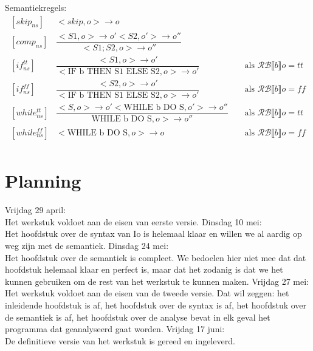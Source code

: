 \documentclass[12pt]{article}
\newcommand{\RB}{\mathcal{RB}}
\begin{document}
Semantiekregels:\\
\renewcommand*{\arraystretch}{2.5}
\[
\begin{matrix}
[skip_{ns}]  & <skip, o> \rightarrow o\\
[comp_{ns}]  & \dfrac{<S1, o> \rightarrow o' <S2, o'> \rightarrow o''}{<S1;S2, o> \rightarrow o''}\\
[if_{ns}^{tt}] & \dfrac{<S1, o> \rightarrow o'}{<\mbox{IF b THEN S1 ELSE S2}, o> \rightarrow o'} &&\mbox{ als }\RB \llbracket b \rrbracket o = tt\\
[if_{ns}^{ff}] & \dfrac{<S2, o> \rightarrow o'}{<\mbox{IF b THEN S1 ELSE S2}, o> \rightarrow o'} &&\mbox{ als }\RB \llbracket b \rrbracket o = ff\\
[while_{ns}^{tt}] & \dfrac{<S, o> \rightarrow o' <\mbox{WHILE b DO S}, o'> \rightarrow o''}{\mbox{WHILE b DO S}, o> \rightarrow o''} &&\mbox{ als }\RB \llbracket b \rrbracket o = tt\\
[while_{ns}^{ff}] & <\mbox{WHILE b DO S}, o> \rightarrow o &&\mbox{ als }\RB \llbracket b \rrbracket o = ff\\
\end{matrix}
\]

\appendix

\section{Planning}
Vrijdag 29 april: \\Het werkstuk voldoet aan de eisen van eerste versie.\newline\newline %
Dinsdag 10 mei: \\Het hoofdstuk over de syntax van Io is helemaal klaar en willen we al aardig op weg zijn met de semantiek.\newline\newline
Dinsdag 24 mei: \\Het hoofdstuk over de semantiek is compleet. We bedoelen hier niet mee dat dat hoofdstuk helemaal klaar en perfect is, maar
dat het zodanig is dat we het kunnen gebruiken om de rest van het werkstuk te kunnen maken.\newline\newline
Vrijdag 27 mei: \\Het werkstuk voldoet aan de eisen van de tweede versie. Dat wil zeggen: het inleidende hoofdstuk is af, het hoofdstuk over de syntax is af, het hoofdstuk over de semantiek is af, het hoofdstuk over de analyse bevat in elk geval het programma dat geanalyseerd gaat worden.\newline\newline
Vrijdag 17 juni: \\De definitieve versie van het werkstuk is gereed en ingeleverd.
\end{document}
